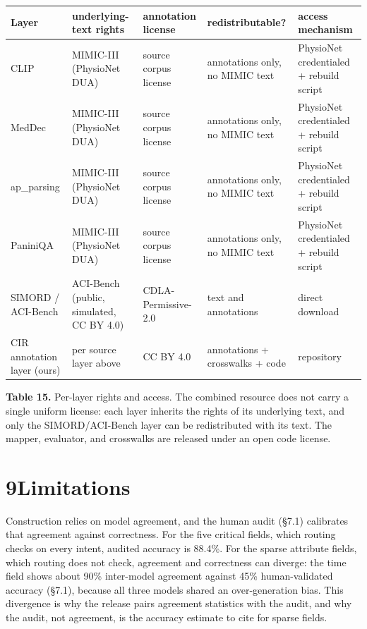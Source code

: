 \begin{table}[ht]
\centering
\small\setlength{\tabcolsep}{4pt}%
\small
\setlength{\tabcolsep}{4pt}
\begin{tabularx}{\linewidth}{>{\hsize=0.913\hsize\raggedright\arraybackslash}X >{\hsize=1.165\hsize\raggedright\arraybackslash}X >{\hsize=0.781\hsize\raggedright\arraybackslash}X >{\hsize=0.995\hsize\raggedright\arraybackslash}X >{\hsize=1.147\hsize\raggedright\arraybackslash}X}
\toprule
Layer & underlying-text rights & annotation license & redistributable? & access mechanism \\
\midrule
CLIP & MIMIC-III (PhysioNet DUA) & source corpus license & annotations only, no MIMIC text & PhysioNet credentialed + rebuild script \\
MedDec & MIMIC-III (PhysioNet DUA) & source corpus license & annotations only, no MIMIC text & PhysioNet credentialed + rebuild script \\
ap\_\allowbreak{}parsing & MIMIC-III (PhysioNet DUA) & source corpus license & annotations only, no MIMIC text & PhysioNet credentialed + rebuild script \\
PaniniQA & MIMIC-III (PhysioNet DUA) & source corpus license & annotations only, no MIMIC text & PhysioNet credentialed + rebuild script \\
SIMORD / ACI-Bench & ACI-Bench (public, simulated, CC BY 4.0) & CDLA-Permissive-2.0 & text and annotations & direct download \\
CIR annotation layer (ours) & per source layer above & CC BY 4.0 & annotations + crosswalks + code & repository \\
\bottomrule
\end{tabularx}
\end{table}

\textbf{Table 15.} Per-layer rights and access. The combined resource does not carry a single uniform license: each layer inherits the rights of its underlying text, and only the SIMORD/ACI-Bench layer can be redistributed with its text. The mapper, evaluator, and crosswalks are released under an open code license.

\section{\texorpdfstring{{9}Limitations}{9Limitations}}\label{limitations}

Construction relies on model agreement, and the human audit (§7.1) calibrates that agreement against correctness. For the five critical fields, which routing checks on every intent, audited accuracy is 88.4\%. For the sparse attribute fields, which routing does not check, agreement and correctness can diverge: the time field shows about 90\% inter-model agreement against 45\% human-validated accuracy (§7.1), because all three models shared an over-generation bias. This divergence is why the release pairs agreement statistics with the audit, and why the audit, not agreement, is the accuracy estimate to cite for sparse fields.

